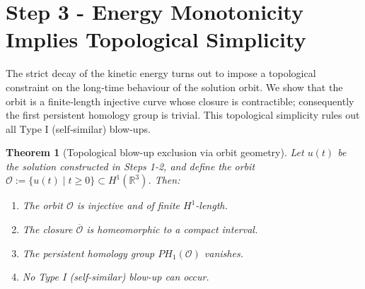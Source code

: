 \documentclass[11pt]{article}
\newtheorem{theorem}{Theorem}[section]
\theoremstyle{definition}
\begin{document}
\section{Step 3 - Energy Monotonicity Implies Topological Simplicity}
\label{sec:step3}

The strict decay of the kinetic energy turns out to impose a topological
constraint on the long‐time behaviour of the solution orbit. We show
that the orbit is a finite‐length injective curve whose closure is
contractible; consequently the first persistent homology group is
trivial. This topological simplicity rules out all Type I
(self‐similar) blow-ups.

\begin{theorem}[Topological blow-up exclusion via orbit geometry]\label{thm:typeI}
Let $u(t)$ be the solution constructed in Steps 1-2, and define the orbit
$\mathcal O := \{ u(t) \mid t \ge 0 \} \subset H^1(\mathbb R^3)$. Then:

\begin{enumerate}
    \item The orbit $\mathcal O$ is injective and of finite $H^1$-length.
    \item The closure $\overline{\mathcal O}$ is homeomorphic to a compact interval.
    \item The persistent homology group $PH_1(\mathcal O)$ vanishes.
    \item No Type I (self-similar) blow-up can occur.
\end{enumerate}
\end{theorem}
\end{document}
